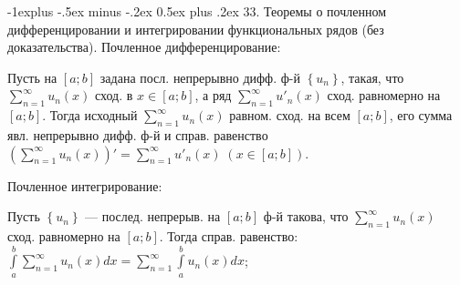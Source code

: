 \documentclass[unicode,10pt, landscape]{article}
\makeatletter
\renewcommand{\subsection}{\@startsection{subsection}{2}{0mm}%
                                {-1explus -.5ex minus -.2ex}%
                                {0.5ex plus .2ex}%
                                {\normalfont\normalsize\bfseries}}
\makeatother
\begin{document}
\begin{multicols}{2}

\subsection{33. Теоремы о почленном дифференцировании и интегрировании функциональных рядов (без доказательства).}
Почленное дифференцирование:
\begin{Th}
Пусть на $\left[a;b\right]$ задана посл. непрерывно дифф. ф-й $\left \{ u_{n} \right \}$, такая, что $\sum_{n=1}^{\infty }u_{n}(x)$ сход. в $x\in \left[a;b\right]$, а ряд $\sum_{n=1}^{\infty }u'_{n}(x)$ сход.  равномерно на $\left[a;b\right]$. Тогда исходный $\sum_{n=1}^{\infty }u_{n}(x)$ равном. сход. на всем $\left[a;b\right]$, его сумма явл. непрерывно дифф. ф-й и справ. равенство $\left ( \sum_{n=1}^{\infty }u_{n}(x) \right )'=\sum_{n=1}^{\infty }u'_{n}(x)\; (x\in \left[a;b\right])$.
\end{Th}
Почленное интегрирование:
\begin{Th}
Пусть $\left \{ u_{n} \right \}$ — послед. непрерыв. на $\left[a;b\right]$ ф-й такова, что $\sum_{n=1}^{\infty }u_{n}(x)$ сход. равномерно на $\left[a;b\right]$. Тогда справ. равенство: $\int\limits_{a}^{b}\sum_{n=1}^{\infty }u_{n}(x)dx=\sum_{n=1}^{\infty }\int\limits_{a}^{b}u_{n}(x)dx$;
\end{Th}



\end{multicols}
\end{document}

